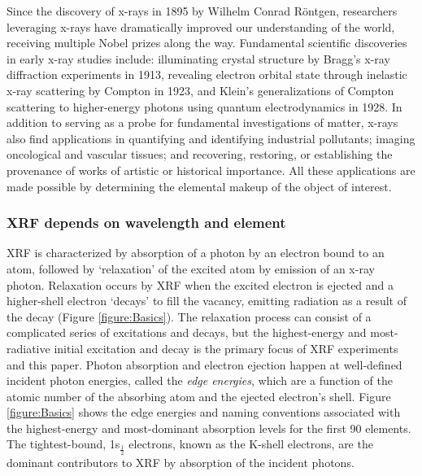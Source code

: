 \documentclass[%
  aip,12pt,tightenlines,
  amsthm,
 amsmath,amssymb
]{article}
\newcommand{\fRef}[1]{Figure \ref{figure:#1}}
\newcommand{\sLabel}[1]{\label{section:#1}}
\newcommand{\firstp}[0]{}
\newcommand{\pl}[0]{\vspace{6pt}}
\begin{document}
\firstp Since the discovery of x-rays in 1895 by Wilhelm Conrad R{\"o}ntgen, researchers leveraging x-rays have dramatically improved our understanding of the world, receiving multiple Nobel prizes along the way.\cite{santra_concepts_2009} Fundamental scientific discoveries in early x-ray studies include: illuminating crystal structure by Bragg's x-ray diffraction experiments in 1913,\cite{bragg_reflection_1913} revealing electron orbital state through inelastic x-ray scattering by Compton in 1923,\cite{compton_spectrum_1923} and Klein's generalizations of Compton scattering to higher-energy photons using quantum electrodynamics in 1928.\cite{klein_scattering_1928} In addition to serving as a probe for fundamental investigations of matter, x-rays also find applications in quantifying and identifying industrial pollutants;\cite{luo_determination_2012} imaging oncological and vascular tissues;\cite{butler_bio-medical_2008} and recovering, restoring, or establishing the provenance of works of artistic \cite{janssens_photon-based_2010} or historical \cite{bergmann_archimedes_2007} importance. All these applications are made possible by determining the elemental makeup of the object of interest. \pl

\subsubsection{\sLabel{Beer}XRF depends on wavelength and element}

\firstp XRF is characterized by absorption of a photon by an electron bound to an atom, followed by `relaxation' of the excited atom by emission of an x-ray photon.\cite{jitschin_progress_1990} Relaxation occurs by XRF when the excited electron is ejected and a higher-shell electron `decays' to fill the vacancy, emitting radiation as a result of the decay (\fRef{Basics}). The relaxation process can consist of a complicated series of excitations and decays,\cite{santra_concepts_2009} but the highest-energy and most-radiative initial excitation and decay is the primary focus of XRF experiments and this paper. Photon absorption and electron ejection happen at well-defined incident photon energies, called the \emph{edge energies}, which are a function of the atomic number of the absorbing atom and the ejected electron's shell.\cite{ueda_high-resolution_2003,de_groot_high-resolution_2001} \fRef{Basics} shows the edge energies and naming conventions associated with the highest-energy and most-dominant\cite{chantler_detailed_2000} absorption levels for the first 90 elements. The tightest-bound, 1s$_{\frac{1}{2}}$ electrons, known as the K-shell electrons, are the dominant contributors to XRF by absorption of the incident photons.\cite{chantler_detailed_2000}
\end{document}
